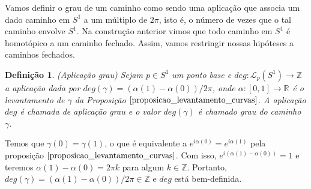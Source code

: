 \documentclass[12pt]{book}
\newtheorem{definicao}[teorema]{Definição}
\newcommand{\caminhos}{\mathcal{L}}
\newcommand{\caminhospontobasegeral}[2]{\caminhos_{#1}(#2)}
\newcommand{\circulo}{S^{1}}
\newcommand{\inteiros}{\mathbb{Z}}
\newcommand{\real}[1]{\mathbb{R}^{#1}}
\begin{document}
	Vamos definir o grau de um caminho como sendo uma aplicação que associa um dado caminho em $\circulo$ a um múltiplo de $2\pi$, isto é, o número de vezes que o tal caminho envolve $\circulo$. Na construção anterior vimos que todo caminho em $\circulo$ é homotópico a um caminho fechado. Assim, vamos restringir nossas hipóteses a caminhos fechados.

	\begin{definicao}\label{definicao_aplicacao_grau}
		(Aplicação grau) Sejam $p \in \circulo$ um ponto base e $deg: \caminhospontobasegeral{p}{\circulo} \to \inteiros$ a aplicação dada por $deg(\gamma) = (\alpha(1)-\alpha(0))/2\pi$, onde $\alpha:[0,1] \to \real{}$ é o levantamento de $\gamma$ da Proposição $\ref{proposicao_levantamento_curvas}$. A aplicação $deg$ é chamada de aplicação grau e o valor $deg(\gamma)$ é chamado grau do caminho $\gamma$.
	\end{definicao}
	
	Temos que $\gamma(0) = \gamma(1)$, o que é equivalente a $e^{i\alpha(0)} = e^{i\alpha(1)}$ pela proposição $\ref{proposicao_levantamento_curvas}$. Com isso, $e^{i(\alpha(1)-\alpha(0))} = 1$ e teremos $\alpha(1)-\alpha(0) = 2\pi k$ para algum $k \in \inteiros$. Portanto, $deg(\gamma) = (\alpha(1)-\alpha(0))/2\pi \in \inteiros$ e $deg$ está bem-definida.
	
\end{document}
